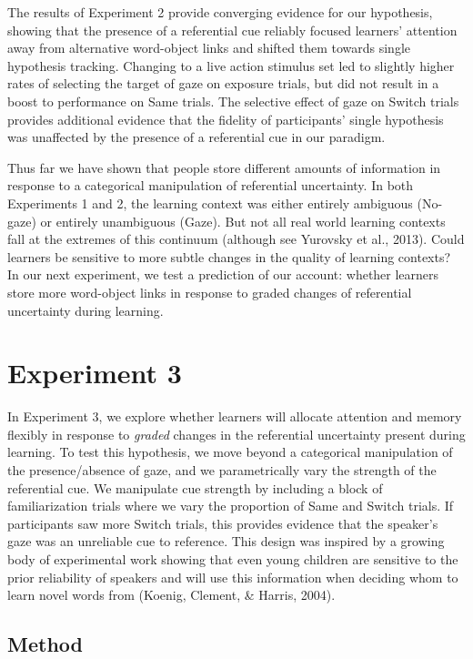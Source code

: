 \documentclass[authoryear, review]{elsarticle}
\begin{document}
The results of Experiment 2 provide converging evidence for our
hypothesis, showing that the presence of a referential cue reliably
focused learners' attention away from alternative word-object links and
shifted them towards single hypothesis tracking. Changing to a live
action stimulus set led to slightly higher rates of selecting the target
of gaze on exposure trials, but did not result in a boost to performance
on Same trials. The selective effect of gaze on Switch trials provides
additional evidence that the fidelity of participants' single hypothesis
was unaffected by the presence of a referential cue in our paradigm.

Thus far we have shown that people store different amounts of
information in response to a categorical manipulation of referential
uncertainty. In both Experiments 1 and 2, the learning context was
either entirely ambiguous (No-gaze) or entirely unambiguous (Gaze). But
not all real world learning contexts fall at the extremes of this
continuum (although see Yurovsky et al., 2013). Could learners be
sensitive to more subtle changes in the quality of learning contexts? In
our next experiment, we test a prediction of our account: whether
learners store more word-object links in response to graded changes of
referential uncertainty during learning.

\section{Experiment 3}\label{experiment-3}

In Experiment 3, we explore whether learners will allocate attention and
memory flexibly in response to \emph{graded} changes in the referential
uncertainty present during learning. To test this hypothesis, we move
beyond a categorical manipulation of the presence/absence of gaze, and
we parametrically vary the strength of the referential cue. We
manipulate cue strength by including a block of familiarization trials
where we vary the proportion of Same and Switch trials. If participants
saw more Switch trials, this provides evidence that the speaker's gaze
was an unreliable cue to reference. This design was inspired by a
growing body of experimental work showing that even young children are
sensitive to the prior reliability of speakers and will use this
information when deciding whom to learn novel words from (Koenig,
Clement, \& Harris, 2004).

\subsection{Method}\label{method-2}
\end{document}
